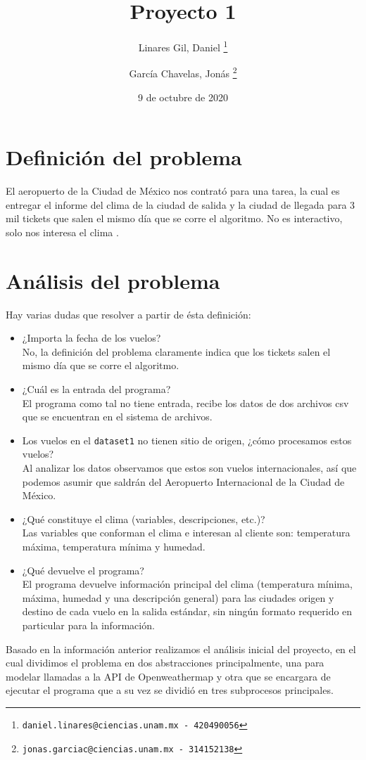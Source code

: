 \documentclass{report}
\author{
Linares Gil, Daniel
    \thanks{\texttt{daniel.linares@ciencias.unam.mx}\texttt{ - 420490056}}
    \and
García Chavelas, Jonás
    \thanks{\texttt{jonas.garciac@ciencias.unam.mx}\texttt{ - 314152138}}
}
\title{Proyecto 1}
\date{9 de octubre de 2020}
\begin{document}
\maketitle

\section*{Definición del problema}
El aeropuerto de la Ciudad de México nos contrató para una tarea, la cual
es entregar el informe del clima de la ciudad de salida y la ciudad de llegada para 3 mil tickets que
salen el mismo día que se corre el algoritmo. No es interactivo, solo nos interesa el clima \cite{P1}.


\section*{Análisis del problema}
Hay varias dudas que resolver a partir de ésta definición:
\begin{itemize}
\item ¿Importa la fecha de los vuelos? 
\\ No, la definición del problema claramente indica que los tickets salen el mismo día que se corre el algoritmo.
\item ¿Cuál es la entrada del programa?
\\ El programa como tal no tiene entrada, recibe los datos de dos archivos csv que se encuentran en el sistema de archivos.
\item Los vuelos en el \texttt{dataset1} no tienen sitio de origen, ¿cómo procesamos estos vuelos?
\\ Al analizar los datos observamos que estos son vuelos internacionales, así que podemos asumir que saldrán del Aeropuerto Internacional de la Ciudad de México.
\item ¿Qué constituye el clima (variables, descripciones, etc.)?
\\ Las variables que conforman el clima e interesan al cliente son: temperatura máxima, temperatura mínima y humedad. 
\item ¿Qué devuelve el programa?
\\ El programa devuelve información principal del clima (temperatura mínima, máxima, humedad y una descripción general) para las ciudades origen y destino de cada vuelo en la salida estándar, sin ningún formato requerido en particular para la información. 

\end{itemize}
Basado en la información anterior realizamos el análisis inicial del proyecto, en el cual dividimos el problema en dos abstracciones principalmente, una para modelar llamadas a la API de Openweathermap y otra que se encargara de ejecutar el programa que a su vez se dividió en tres subprocesos principales.
\end{document}
